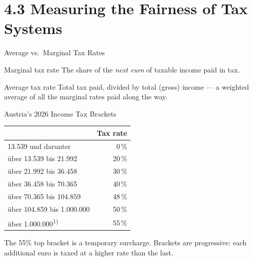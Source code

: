 \documentclass[11pt,aspectratio=169]{beamer}
\begin{document}
\section{4.3 Measuring the Fairness of Tax Systems}

\begin{frame}{Average vs.\ Marginal Tax Rates}
  \begin{block}{Marginal tax rate}
    The share of the \emph{next euro} of taxable income paid in tax.
  \end{block}
  \begin{block}{Average tax rate}
    Total tax paid, divided by total (gross) income --- a weighted average of all the marginal rates paid along the way.
  \end{block}
\end{frame}

\begin{frame}{Austria's 2026 Income Tax Brackets}
 \begin{table}
 	\centering
 	\begin{tabular}{@{}lr@{}}
 		\toprule
 		\textbf{ } & \textbf{Tax rate} \\
 		\midrule
 		13.539 und darunter & 0\,\% \\
 		über 13.539 bis 21.992 & 20\,\% \\
 		über 21.992 bis 36.458 & 30\,\% \\
 		über 36.458 bis 70.365 & 40\,\% \\
 		über 70.365 bis 104.859 & 48\,\% \\
 		über 104.859 bis 1.000.000 & 50\,\% \\
 		über 1.000.000\textsuperscript{1)} & 55\,\% \\
 		\bottomrule
 	\end{tabular}

 \end{table}


  \vspace{0.5em}
   \small
  The 55\% top bracket is a temporary surcharge. Brackets are progressive: each additional euro is taxed at a higher rate than the last.\\

\end{frame}
\end{document}
